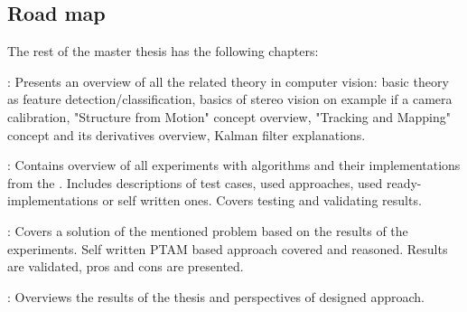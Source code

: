 \documentclass[../main]{subfiles}
\begin{document}
\subsection{Road map}

The rest of the master thesis has the following chapters: 

: Presents an overview of all the related theory in computer vision: basic theory as feature detection/classification, basics of stereo vision on example if a camera calibration, "Structure from Motion" concept overview, "Tracking and Mapping" concept and its derivatives overview, Kalman filter explanations.

: Contains overview of all experiments with algorithms and their implementations from the . Includes descriptions of test cases, used approaches, used ready-implementations or self written ones. Covers testing and validating results.

: Covers a solution of the mentioned problem based on the results of the experiments. Self written PTAM based approach covered and reasoned. Results are validated, pros and cons are presented.

: Overviews the results of the thesis and perspectives of designed approach.
\end{document}
